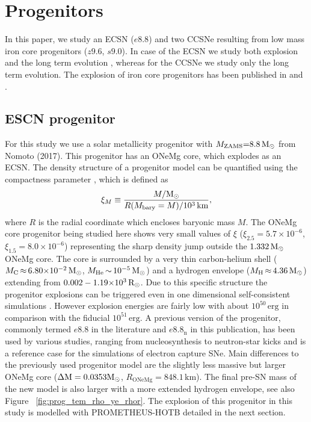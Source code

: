 \documentclass[fleqn,usenatbib]{mnras}
\newcommand{\solr}{\ensuremath{\rm{R_{\odot}}}\xspace}
\newcommand{\solm}{\xspace\ensuremath{\rm{M_{\odot}}}\xspace}
\newcommand{\prom}{\textsc{P{\footnotesize ROMETHEUS}-H{\footnotesize OT}B}\xspace}
\begin{document}
\section{Progenitors}
In this paper, we study an ECSN ($e8.8$) and two CCSNe resulting from low mass iron core progenitors ($z9.6$, $s9.0$). In case of the ECSN we study both explosion and the long term evolution , whereas for the CCSNe we study only the long term evolution. The explosion of iron core progenitors has been published in \cite{Melson2015a} and \cite{Melson2019}. 

\subsection{ESCN progenitor}
For this study we use a solar metallicity progenitor with $M_{\rm ZAMS}\mathord{=}8.8\,\solm$ from Nomoto (2017). This progenitor has an ONeMg core, which explodes as an ECSN. The density structure of a progenitor model can be quantified using the compactness parameter \citep{Oconnor2011}, which is defined as
\begin{equation}
\label{equ:compactness}
  \xi_{M} \equiv \frac{M/\solm}{R(M_{\rm bary}=M)/10^{3}\, \rm km},
\end{equation}
where $R$ is the radial coordinate which encloses baryonic mass $M$. The ONeMg core progenitor being studied here shows very small values of $\xi$ ($\xi_{2.5}=5.7\times10^{-6}$, $\xi_{1.5}=8.0\times10^{-6}$)  representing the sharp density jump outside the $1.332\, \solm$  ONeMg core. The core is surrounded by a very thin carbon-helium shell ($M_{\rm C}\,\mathord{\approx}\, 6.80\mathord{\times}10^{-2}\, \solm$, $M_{\rm He}\,\mathord{\sim}\,10^{-5}\, \solm$) and a hydrogen envelope ($M_{\rm H}\,\mathord{\approx}\, 4.36\, \solm$) extending from $\mathord{0.002}- \mathord{1.19}\mathord{\times}10^{3}\, \solr$.
Due to this specific structure the progenitor explosions can be triggered even in one dimensional self-consistent simulations \citet{Groote2014, Kitaura2006}. However explosion energies are fairly low with about $10^{50}\,\mathrm{erg}$ in comparison with the fiducial $10^{51}\,\text{erg}$. 
A previous version of the progenitor, commonly termed $e8.8$ in the literature and $e8.8_{\mathrm{n}}$ in this publication, has been used by various studies, ranging from nucleosynthesis \citep{Wanajo2018} to neutron-star kicks \citep{Gessner2018} and is a reference case for the simulations of electron capture SNe. Main differences to the previously used progenitor model are the slightly less massive but larger ONeMg core ($\mathrm{\Delta M = 0.0353\solm}$, $R_{\mathrm{ONeMg}}=848.1\,\mathrm{km}$). The final pre-SN mass of the new model is also larger with a more extended hydrogen envelope, see also Figure ~\ref{fig:prog_tem_rho_ye_rhor}. The explosion of this progenitor  in this study is modelled with \prom detailed in the next section.
\end{document}
